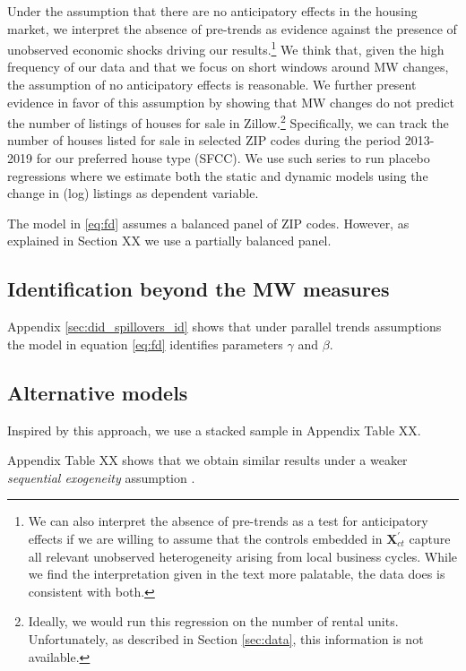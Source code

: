 Under the assumption that there are no anticipatory effects in the housing 
market, we interpret the absence of pre-trends as evidence against the presence 
of unobserved economic shocks driving our results.\footnote{We can also interpret the absence of pre-trends as a test 
	for anticipatory effects if we are willing to assume that the controls embedded in 
	$\mathbf{X}^{'}_{ct}$ capture all relevant unobserved heterogeneity arising from local 
	business cycles. While we find the interpretation given in the text more palatable, the 
	data does is consistent with both.}
    We think that, given the high frequency of our data and that we focus on short windows around MW 
    changes, the assumption of no anticipatory effects is reasonable. We further present evidence in 
    favor of this assumption by showing that MW changes do not predict the number of listings of 
    houses for sale in Zillow.\footnote{Ideally, we would run this regression on the number of rental 
        units. Unfortunately, as described in Section \ref{sec:data}, this information is not available.}
    Specifically, we can track the number of houses listed for sale in selected ZIP codes during the 
    period 2013-2019 for our preferred house type (SFCC). We use such series to run placebo 
    regressions where we estimate both the static and dynamic models using the change in (log) 
    listings as dependent variable. %




The model in \ref{eq:fd} assumes a balanced panel of ZIP codes.
However, as explained in Section XX   %
we use a partially balanced panel.

\subsection{Identification beyond the MW measures}

Appendix \ref{sec:did_spillovers_id} shows that under parallel trends assumptions
the model in equation \ref{eq:fd} identifies parameters $\gamma$ and $\beta$.


\subsection{Alternative models}


Inspired by this approach, we use a stacked sample in Appendix Table XX.

Appendix Table XX shows that we obtain similar results under a weaker 
\textit{sequential exogeneity} assumption \parencite{ArellanoHonore2001}.
